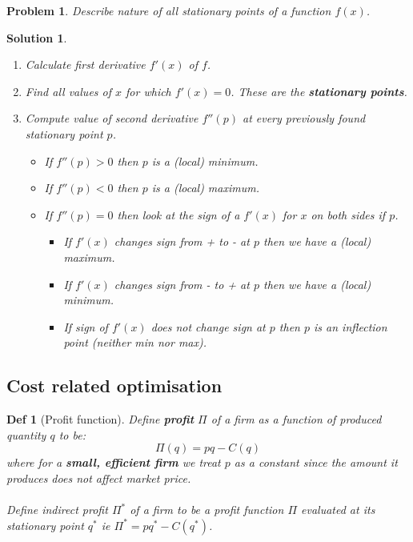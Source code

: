 \documentclass[11pt,a4paper, margin]{article}
\theoremstyle{break}
\newtheorem*{problem}{Problem}
\theoremstyle{break}
\newtheorem*{solution}{Solution}
\newtheorem*{definition}{Def}
\begin{document}
\begin{problem}
Describe nature of all stationary points of a function $f(x)$.
\end{problem}

\begin{solution}
\begin{enumerate}
	\item Calculate first derivative $f'(x)$ of $f$.
	\item Find all values of $x$ for which $f'(x)=0$. These are the \textbf{stationary points}.
	\item Compute value of second derivative $f''(p)$ at every previously found stationary point $p$.
	\begin{itemize}
		\item If $f''(p) > 0$ then $p$ is a (local) minimum.
		\item If $f''(p) < 0$ then $p$ is a (local) maximum.
		\item If $f''(p) = 0$ then look at the sign of a $f'(x)$ for $x$ on both sides if $p$.
		\begin{itemize}
			\item If $f'(x)$ changes sign from + to - at $p$ then we have a (local) maximum.
			\item If $f'(x)$ changes sign from - to + at $p$ then we have a (local) minimum.
			\item If sign of $f'(x)$ does not change sign at $p$ then $p$ is an inflection point (neither min nor max).
		\end{itemize}
	\end{itemize}
\end{enumerate}
\end{solution}

\subsection{Cost related optimisation}

\begin{definition} [Profit function]
Define \textbf{profit} $\Pi$ of a firm as a function of produced quantity $q$ to be:
\[\Pi(q) = pq - C(q)\]
where for a \textbf{small, efficient firm} we treat $p$ as a constant since the amount it produces does not affect market price.\\\\
Define indirect profit $\Pi^\ast$ of a firm to be a profit function $\Pi$ evaluated at its stationary point $q^\ast$ ie $\Pi^\ast = pq^\ast - C(q^\ast)$. 
\end{definition}
\end{document}
